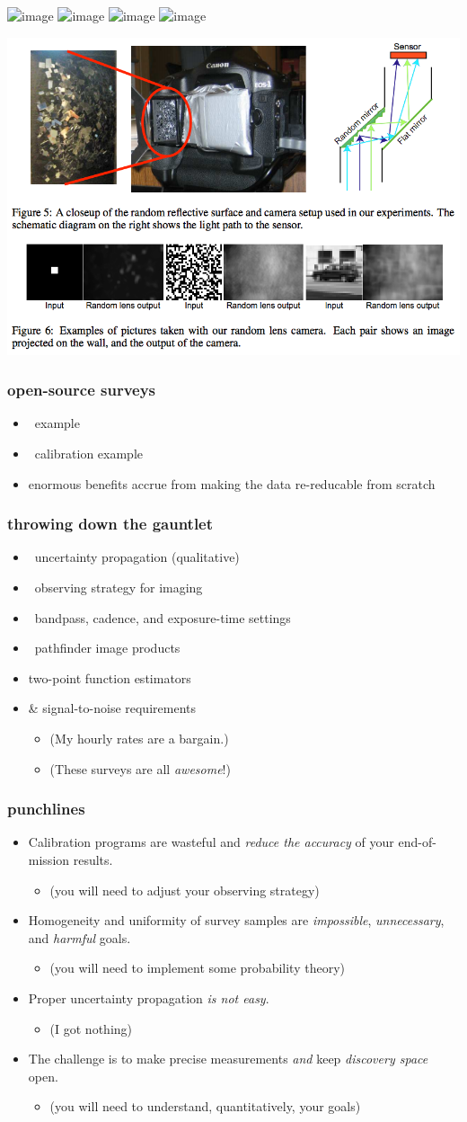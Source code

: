 \documentclass[pdftex]{beamer}
\newcommand{\conclusionslide}{
\begin{frame}
  \frametitle{punchlines}
  \begin{itemize}
  \item Calibration programs are wasteful and \emph{reduce the accuracy} of your end-of-mission results.
    \begin{itemize}
    \item (you will need to adjust your observing strategy)
    \end{itemize}
  \item Homogeneity and uniformity of survey samples are \emph{impossible}, \emph{unnecessary}, and \emph{harmful} goals.
    \begin{itemize}
    \item (you will need to implement some probability theory)
    \end{itemize}
  \item Proper uncertainty propagation \emph{is not easy}.
    \begin{itemize}
    \item (I got nothing)
    \end{itemize}
  \item The challenge is to make precise measurements \emph{and} keep \emph{discovery space} open.
    \begin{itemize}
    \item (you will need to understand, quantitatively, your goals)
    \end{itemize}
  \end{itemize}
\end{frame}
}
\begin{document}
\begin{frame}
  \includegraphics<1>[width=1.05\textwidth]{p1640data.png}
  \includegraphics<2>[width=1.05\textwidth]{p1640detections.png}
  \includegraphics<3>[width=1.05\textwidth]{p1640method.png}
  \includegraphics<4>[width=1.05\textwidth]{p1640spectra.png}
\end{frame}

\begin{frame}
\includegraphics[width=1.05\textwidth]{fergus.png}
\end{frame}

\begin{frame}
  \frametitle{open-source surveys}
  \begin{itemize}
  \item \hipparcos\ example
  \item \sdss\ calibration example
  \item enormous benefits accrue from making the data re-reducable from scratch
  \end{itemize}
\end{frame}

\begin{frame}
  \frametitle{throwing down the gauntlet}
  \begin{itemize}
  \item \gaia\ uncertainty propagation (qualitative)
  \item \euclid\ observing strategy for imaging
  \item \lsst\ bandpass, cadence, and exposure-time settings
  \item \ska\ pathfinder image products
  \item {} two-point function estimators
  \item {} \&  signal-to-noise requirements
    \begin{itemize}
    \item (My hourly rates are a bargain.)
    \item (These surveys are all \emph{awesome}!)
    \end{itemize}
  \end{itemize}
\end{frame}

\conclusionslide
\end{document}
